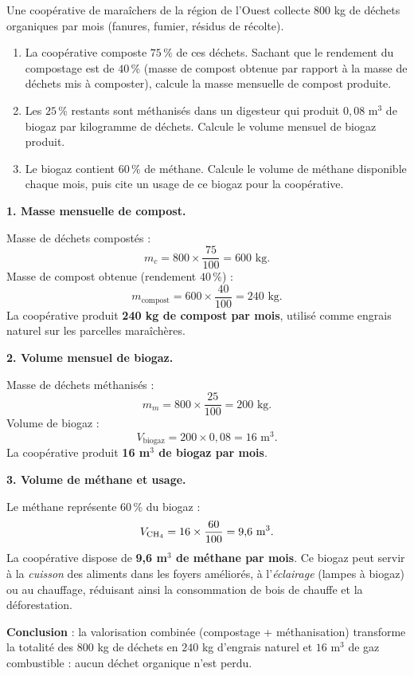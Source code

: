 \documentclass[11pt]{article}
\begin{document}
\begin{exoresolu}
Une coopérative de maraîchers de la région de l'Ouest collecte $800$ kg de déchets organiques par mois (fanures, fumier, résidus de récolte).
\begin{enumerate}
\item La coopérative composte $75\,\%$ de ces déchets. Sachant que le rendement du compostage est de $40\,\%$ (masse de compost obtenue par rapport à la masse de déchets mis à composter), calcule la masse mensuelle de compost produite.
\item Les $25\,\%$ restants sont méthanisés dans un digesteur qui produit $0{,}08$ m$^3$ de biogaz par kilogramme de déchets. Calcule le volume mensuel de biogaz produit.
\item Le biogaz contient $60\,\%$ de méthane. Calcule le volume de méthane disponible chaque mois, puis cite un usage de ce biogaz pour la coopérative.
\end{enumerate}
\tcblower
\textbf{1. Masse mensuelle de compost.}

Masse de déchets compostés :
\[ m_c = 800 \times \dfrac{75}{100} = 600 \text{ kg.} \]
Masse de compost obtenue (rendement $40\,\%$) :
\[ m_{\text{compost}} = 600 \times \dfrac{40}{100} = 240 \text{ kg.} \]
La coopérative produit \textbf{240 kg de compost par mois}, utilisé comme engrais naturel sur les parcelles maraîchères.

\textbf{2. Volume mensuel de biogaz.}

Masse de déchets méthanisés :
\[ m_m = 800 \times \dfrac{25}{100} = 200 \text{ kg.} \]
Volume de biogaz :
\[ V_{\text{biogaz}} = 200 \times 0{,}08 = 16 \text{ m}^3. \]
La coopérative produit \textbf{16 m$^3$ de biogaz par mois}.

\textbf{3. Volume de méthane et usage.}

Le méthane représente $60\,\%$ du biogaz :
\[ V_{\ce{CH4}} = 16 \times \dfrac{60}{100} = 9{,}6 \text{ m}^3. \]
La coopérative dispose de \textbf{9,6 m$^3$ de méthane par mois}. Ce biogaz peut servir à la \emph{cuisson} des aliments dans les foyers améliorés, à l'\emph{éclairage} (lampes à biogaz) ou au chauffage, réduisant ainsi la consommation de bois de chauffe et la déforestation.

\textbf{Conclusion} : la valorisation combinée (compostage + méthanisation) transforme la totalité des $800$ kg de déchets en $240$ kg d'engrais naturel et $16$ m$^3$ de gaz combustible : aucun déchet organique n'est perdu.
\end{exoresolu}
\end{document}
